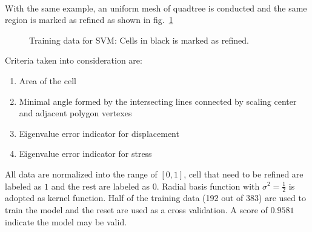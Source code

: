 \paragraph{}
With the same example, an uniform mesh of quadtree is conducted and the same region is marked as refined as shown in fig.~\ref{adap_fig:svm_train_my}
\begin{figure}[!ht]
    \centering
    \caption[Training data for SVM]{Training data for SVM: Cells in black is marked as refined.}
    \label{adap_fig:svm_train_my}
\end{figure}
Criteria taken into consideration are: 
\begin{enumerate}
    \item Area of the cell
    \item Minimal angle formed by the intersecting lines connected by scaling center and adjacent polygon vertexes
    \item Eigenvalue error indicator for displacement
    \item Eigenvalue error indicator for stress
\end{enumerate}
All data are normalized into the range of $[0,1]$, cell that need to be refined are labeled as $1$ and the rest are labeled as $0$.
Radial basis function with $\sigma^2=\frac{1}{2}$ is adopted as kernel function.
Half of the training data (192 out of 383) are used to train the model and the reset are used as a cross validation.
A score of $0.9581$ indicate the model may be valid.





\pagebreak